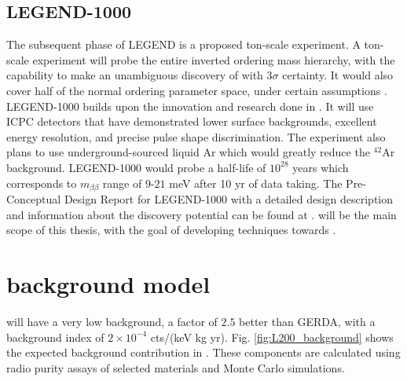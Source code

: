 \subsection{LEGEND-1000}
The subsequent phase of LEGEND is a proposed ton-scale experiment. A ton-scale experiment will probe the entire inverted ordering mass hierarchy, with the capability to make an unambiguous discovery of {\onbb} with $3\sigma$ certainty. It would also cover half of the normal ordering parameter space, under certain assumptions \cite{l1000_pcdr}. LEGEND-1000 builds upon the innovation and research done in {\Ltwo}. It will use ICPC detectors that have demonstrated lower surface backgrounds, excellent energy resolution, and precise pulse shape discrimination. The experiment also plans to use underground-sourced liquid Ar which would greatly reduce the $^{42}$Ar background. LEGEND-1000 would probe a half-life of $10^{28}$ years which corresponds to $m_{\beta\beta}$ range of $9$-$21$ meV after 10 yr of data taking. The Pre-Conceptual Design Report for LEGEND-1000 with a detailed design description and information about the discovery potential can be found at \cite{l1000_pcdr}. {\Ltwo} will be the main scope of this thesis, with the goal of developing techniques towards {\Lthou}.




\section{{\Ltwo} background model}

{\Ltwo} will have a very low background, a factor of $2.5$ better than GERDA, with a background index of $2 \times 10^{-4}$ cts/(keV kg yr). Fig. \ref{fig:L200_background} shows the expected background contribution in {\Ltwo}. These components are calculated using radio purity assays of selected materials and Monte Carlo simulations. 

